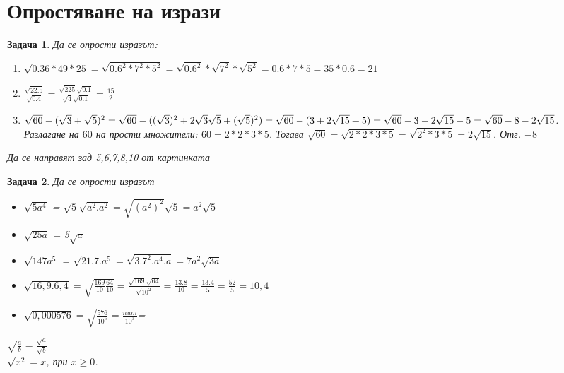 \documentclass{article}
\newtheorem{problem}{Задача}
\begin{document}
\section{Опростяване на изрази}

\begin{problem}
	 Да се опрости изразът:
	 \begin{enumerate}
	 	\item $\sqrt{0.36*49*25} = \sqrt{0.6^2*7^2*5^2} = \sqrt{0.6^2}*\sqrt{7^2}*\sqrt{5^2} = 0.6*7*5 = 35*0.6 = 21$
	 	\item $\frac{\sqrt{22.5}}{\sqrt{0.4}} = \frac{\sqrt {225} \sqrt {0.1}}{\sqrt4 \sqrt{0.1}} = \frac{15}{2} $
	 	\item $\sqrt{60} - (\sqrt3 + \sqrt{5})^2 = \sqrt{60} - ((\sqrt{3})^2 + 2\sqrt{3}\sqrt{5}+ (\sqrt{5})^2 ) = \\ \sqrt{60} - (3+2\sqrt{15}+5)   =\sqrt{60} - 3 - 2\sqrt{15} -5  = \sqrt{60} -8 - 2\sqrt{15}   $. \\ Разлагане на $60$ на прости множители: $60 = 2*2*3*5$. Тогава $\sqrt{60} = \sqrt{2*2*3*5} = \sqrt{2^2*3*5} = 2 \sqrt{15} $.
	 	Отг. $-8$

	 \end{enumerate}
 Да се направят зад 5,6,7,8,10 от картинката 
 
\end{problem}

\begin{problem}
	Да се опрости изразът
	\begin{itemize}
		\item $\sqrt{5a^4} $ = $\sqrt{5}\sqrt{a^2.a^2} = \sqrt{ (a^2)^2}\sqrt5 = a^2\sqrt{5}$
		\item  $\sqrt{25a}$ = 5$\sqrt{a}$ 
		\item $\sqrt{147a^5} $ = $\sqrt{21.7.a^5}=\sqrt{3.7^2.a^4.a}= 7a^2\sqrt{3a}$
		\item $\sqrt{16,9.6,4}  = \sqrt{ \frac{169}{10}\frac{64}{10}} = \frac{\sqrt {169} \sqrt {64}}{\sqrt{10^2}} = \frac{13.8}{10} = \frac{13.4}{5} = \frac{52}{5} = 10,4$
		\item $\sqrt {0,000576}  = \sqrt{\frac{576 }{10^6} }=\frac{num}{10^3}$=
	\end{itemize}

$\sqrt {\frac{a}{b}} = \frac{\sqrt a}{\sqrt b} $ \\
$\sqrt{x^2} = x $, при $x \geq0$.

\end{problem}
\end{document}
